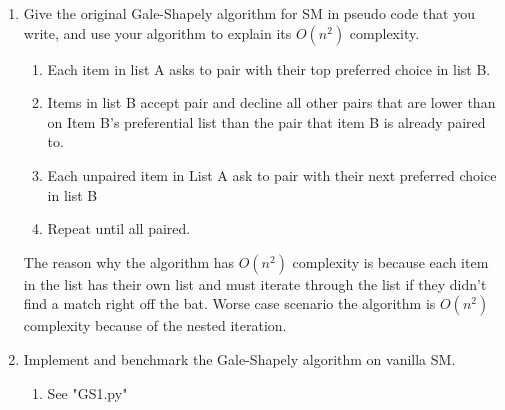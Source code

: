 \documentclass{article}
\begin{document}
\begin{enumerate}
    \item {Give the original Gale-Shapely algorithm for SM in pseudo code that you write, and use your algorithm to explain its $O(n^2)$ complexity.}
    \begin{enumerate}
        \item Each item in list A asks to pair with their top preferred choice in list B. 
        \item Items in list B accept pair and decline all other pairs that are lower than on Item B's preferential list than the pair that item B is already paired to.
        \item Each unpaired item in List A ask to pair with their next preferred choice in list B
        \item Repeat until all paired. 
    \end{enumerate}
    The reason why the algorithm has $O(n^2)$ complexity is because each item in the list has their own list and must iterate through the list if they didn't find a match right off the bat. Worse case scenario the algorithm is $O(n^2)$ complexity because of the nested iteration.
    \item{Implement and benchmark the Gale-Shapely algorithm on vanilla SM.}
    \begin{enumerate}
        \item See "GS1.py"
    \end{enumerate}
\end{enumerate}
\end{document}
